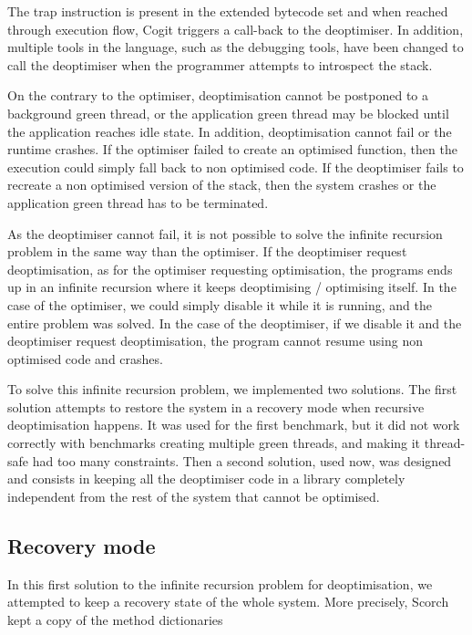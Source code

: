 \documentclass[a4paper,12pt,twoside]{../includes/ThesisStyle}
\begin{document}
The trap instruction is present in the extended bytecode set and when reached through execution flow, Cogit triggers a call-back to the deoptimiser. In addition, multiple tools in the language, such as the debugging tools, have been changed to call the deoptimiser when the programmer attempts to introspect the stack.

On the contrary to the optimiser, deoptimisation cannot be postponed to a background green thread, or the application green thread may be blocked until the application reaches idle state. In addition, deoptimisation cannot fail or the runtime crashes. If the optimiser failed to create an optimised function, then the execution could simply fall back to non optimised code. If the deoptimiser fails to recreate a non optimised version of the stack, then the system crashes or the application green thread has to be terminated.


As the deoptimiser cannot fail, it is not possible to solve the infinite recursion problem in the same way than the optimiser. If the deoptimiser request deoptimisation, as for the optimiser requesting optimisation, the programs ends up in an infinite recursion where it keeps deoptimising / optimising itself. In the case of the optimiser, we could simply disable it while it is running, and the entire problem was solved. In the case of the deoptimiser, if we disable it and the deoptimiser request deoptimisation, the program cannot resume using non optimised code and crashes. 

To solve this infinite recursion problem, we implemented two solutions. The first solution attempts to restore the system in a recovery mode when recursive deoptimisation happens. It was used for the first benchmark, but it did not work correctly with benchmarks creating multiple green threads, and making it thread-safe had too many constraints. Then a second solution, used now, was designed and consists in keeping all the deoptimiser code in a library completely independent from the rest of the system that cannot be optimised.

\subsection{Recovery mode}

In this first solution to the infinite recursion problem for deoptimisation, we attempted to keep a recovery state of the whole system. More precisely, Scorch kept a copy of the method dictionaries
\end{document}
